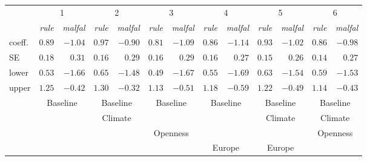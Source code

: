 \begin{tabular}{lrrrrrrrrrrrr}
\hline \hline 
& \multicolumn{2}{c}{1} & \multicolumn{2}{c}{2} & \multicolumn{2}{c}{3} & \multicolumn{2}{c}{4} & \multicolumn{2}{c}{5} & \multicolumn{2}{c}{6}\\ 
& \multicolumn{1}{c}{\emph{rule}} & \multicolumn{1}{c}{\emph{malfal}} & \multicolumn{1}{c}{\emph{rule}} & \multicolumn{1}{c}{\emph{malfal}} & \multicolumn{1}{c}{\emph{rule}} & \multicolumn{1}{c}{\emph{malfal}} & \multicolumn{1}{c}{\emph{rule}} & \multicolumn{1}{c}{\emph{malfal}} & \multicolumn{1}{c}{\emph{rule}} & \multicolumn{1}{c}{\emph{malfal}} & \multicolumn{1}{c}{\emph{rule}} & \multicolumn{1}{c}{\emph{malfal}}\\ 
 \hline 
 
coeff. & $0.89$ & $-1.04$ & $0.97$ & $-0.90$ & $0.81$ & $-1.09$ & $0.86$ & $-1.14$ & $0.93$ & $-1.02$ & $0.86$ & $-0.98$\\ 
SE & $0.18$ & $0.31$ & $0.16$ & $0.29$ & $0.16$ & $0.29$ & $0.16$ & $0.27$ & $0.15$ & $0.26$ & $0.14$ & $0.27$\\ 
lower & $0.53$ & $-1.66$ & $0.65$ & $-1.48$ & $0.49$ & $-1.67$ & $0.55$ & $-1.69$ & $0.63$ & $-1.54$ & $0.59$ & $-1.53$\\ 
upper & $1.25$ & $-0.42$ & $1.30$ & $-0.32$ & $1.13$ & $-0.51$ & $1.18$ & $-0.59$ & $1.22$ & $-0.49$ & $1.14$ & $-0.43$\\ 
& \multicolumn{2}{c}{Baseline} & \multicolumn{2}{c}{Baseline} & \multicolumn{2}{c}{Baseline} & \multicolumn{2}{c}{Baseline} & \multicolumn{2}{c}{Baseline} & \multicolumn{2}{c}{Baseline}\\ 
& \multicolumn{2}{c}{} & \multicolumn{2}{c}{Climate} & \multicolumn{2}{c}{} & \multicolumn{2}{c}{} & \multicolumn{2}{c}{Climate} & \multicolumn{2}{c}{Climate}\\ 
& \multicolumn{2}{c}{} & \multicolumn{2}{c}{} & \multicolumn{2}{c}{Openness} & \multicolumn{2}{c}{} & \multicolumn{2}{c}{} & \multicolumn{2}{c}{Openness}\\ 
& \multicolumn{2}{c}{} & \multicolumn{2}{c}{} & \multicolumn{2}{c}{} & \multicolumn{2}{c}{Europe} & \multicolumn{2}{c}{Europe} & \multicolumn{2}{c}{}\\ 
 \hline
\end{tabular} 
 
 \vspace{2em} 
 
